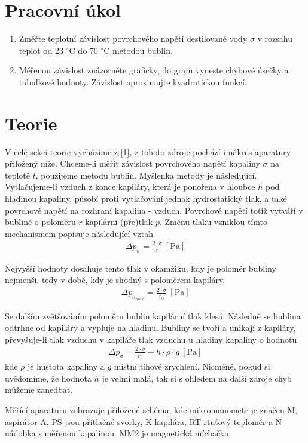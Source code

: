 \documentclass[a4paper]{article}
\author{"Patrik Novotný"}
\begin{document}
\section*{Pracovní úkol}
\begin{enumerate}
\item Změřte teplotní závislost povrchového napětí destilované vody $\sigma$ v rozsahu teplot od 23 $^\circ$C do 70 $^\circ$C metodou bublin.
\item Měřenou závislost znázorněte graficky, do grafu vyneste chybové úsečky a tabulkové hodnoty. Závislost aproximujte kvadratickou funkcí.
\end{enumerate}
\section*{Teorie}
V celé sekci teorie vycházíme z [1], z tohoto zdroje pochází i nákres aparatury přiložený níže. Chceme-li měřit závislost povrchového napětí kapaliny $\sigma$ na teplotě $t$, použijeme metodu bublin. Myšlenka metody je následující. Vytlačujeme-li vzduch z konce kapiláry, která je ponořena v hloubce $h$ pod hladinou kapaliny, působí proti vytlačování jednak hydrostatický tlak, a také povrchové napětí na rozhraní kapalina - vzduch. Povrchové napětí totiž vytváří v bublině o poloměru $r$ kapilární (pře)tlak $p$. Změnu tlaku vzniklou tímto mechanismem popisuje následující vztah
\begin{align}
\Delta p_{\sigma} = \frac{2 \cdot \sigma}{r} \: \mathrm{[Pa]}
\end{align}
\par Nejvyšší hodnoty dosahuje tento tlak v okamžiku, kdy je poloměr bubliny nejmenší, tedy v době, kdy je shodný s poloměrem kapiláry.
\begin{align}
\Delta p_{\sigma_{max}} = \frac{2 \cdot \sigma}{r_{0}} \: \mathrm{[Pa]}
\end{align}
\par Se dalším zvětšováním poloměru bublin kapilární tlak klesá. Následně se bublina odtrhne od kapiláry a vypluje na hladinu. Bubliny se tvoří a unikají z kapiláry, převyšuje-li tlak vzduchu v kapiláře tlak vzduchu u hladiny kapaliny o hodnotu
\begin{align}
\Delta p_{\sigma} = \frac{2 \cdot \sigma}{r_{0}} + h \cdot \rho \cdot g \: \mathrm{[Pa]}
\end{align}
kde $\rho$ je hustota kapaliny a $g$ místní tíhové zrychlení. Nicméně, pokud si uvědomíme, že hodnota $h$ je velmi malá, tak si s ohledem na další zdroje chyb můžeme zanedbat.
\par Měřící aparaturu zobrazuje přiložené schéma, kde mikromanometr je značen M, aspirátor A, PS jsou přítlačné svorky, K kapilára, RT rtuťový teploměr a N nádobka s měřenou kapalinou. MM2 je magnetická míchačka.
\end{document}
